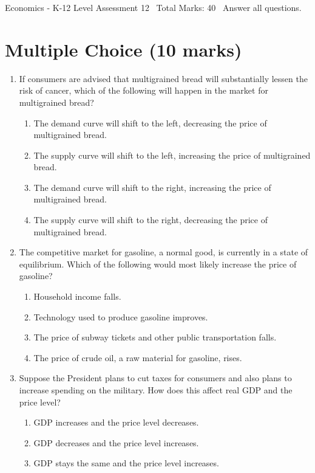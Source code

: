 \documentclass[12pt]{article}
\begin{document}
\begin{center}
Economics - K-12 Level Assessment 12 \
Total Marks: 40 \
Answer all questions.
\end{center}

\section*{Multiple Choice (10 marks)}
\begin{enumerate}[label=\arabic*.]
\item If consumers are advised that multigrained bread will substantially lessen the risk of cancer, which of the following will happen in the market for multigrained bread?
\begin{enumerate}[label=(\alph*)]
    \item The demand curve will shift to the left, decreasing the price of multigrained bread.
    \item The supply curve will shift to the left, increasing the price of multigrained bread.
    \item The demand curve will shift to the right, increasing the price of multigrained bread.
    \item The supply curve will shift to the right, decreasing the price of multigrained bread.
\end{enumerate}
\item The competitive market for gasoline, a normal good, is currently in a state of equilibrium. Which of the following would most likely increase the price of gasoline?
\begin{enumerate}[label=(\alph*)]
    \item Household income falls.
    \item Technology used to produce gasoline improves.
    \item The price of subway tickets and other public transportation falls.
    \item The price of crude oil, a raw material for gasoline, rises.
\end{enumerate}
\item Suppose the President plans to cut taxes for consumers and also plans to increase spending on the military. How does this affect real GDP and the price level?
\begin{enumerate}[label=(\alph*)]
    \item GDP increases and the price level decreases.
    \item GDP decreases and the price level increases.
    \item GDP stays the same and the price level increases.

\end{enumerate}
\end{enumerate}
\end{document}
